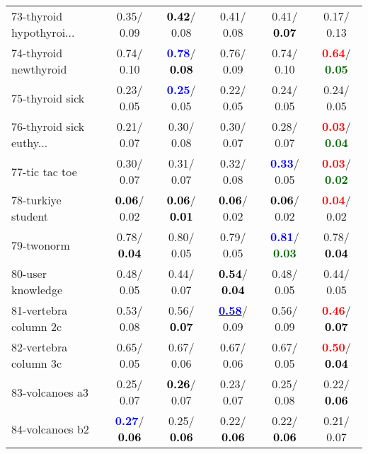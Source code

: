\begin{table}[h]
\begin{center}
\begin{tabular}{lc|c|c|c|c}
73-thyroid hypothyroi... &   0.35/  0.09 & \textcolor{black}{\textbf{  0.42}}/  0.08 &   0.41/  0.08 &   0.41/\textcolor{black}{\textbf{  0.07}} &   0.17/  0.13 \\
74-thyroid newthyroid &   0.74/  0.10 & \textcolor{blue}{\textbf{  0.78}}/\textcolor{black}{\textbf{  0.08}} &   0.76/  0.09 &   0.74/  0.10 & \textcolor{red}{\textbf{  0.64}}/\textcolor{darkgreen}{\textbf{  0.05}} \\
75-thyroid sick &   0.23/  0.05 & \textcolor{blue}{\textbf{  0.25}}/  0.05 &   0.22/  0.05 &   0.24/  0.05 &   0.24/  0.05 \\
76-thyroid sick euthy... &   0.21/  0.07 &   0.30/  0.08 &   0.30/  0.07 &   0.28/  0.07 & \textcolor{red}{\textbf{  0.03}}/\textcolor{darkgreen}{\textbf{  0.04}} \\
77-tic tac toe &   0.30/  0.07 &   0.31/  0.07 &   0.32/  0.08 & \textcolor{blue}{\textbf{  0.33}}/  0.05 & \textcolor{red}{\textbf{  0.03}}/\textcolor{darkgreen}{\textbf{  0.02}} \\
78-turkiye student & \textcolor{black}{\textbf{  0.06}}/  0.02 & \textcolor{black}{\textbf{  0.06}}/\textcolor{black}{\textbf{  0.01}} & \textcolor{black}{\textbf{  0.06}}/  0.02 & \textcolor{black}{\textbf{  0.06}}/  0.02 & \textcolor{red}{\textbf{  0.04}}/  0.02 \\ \hline
79-twonorm &   0.78/\textcolor{black}{\textbf{  0.04}} &   0.80/  0.05 &   0.79/  0.05 & \textcolor{blue}{\textbf{  0.81}}/\textcolor{darkgreen}{\textbf{  0.03}} &   0.78/\textcolor{black}{\textbf{  0.04}} \\
80-user knowledge &   0.48/  0.05 &   0.44/  0.07 & \textcolor{black}{\textbf{  0.54}}/\textcolor{black}{\textbf{  0.04}} &   0.48/  0.05 &   0.44/  0.05 \\
81-vertebra column 2c &   0.53/  0.08 &   0.56/\textcolor{black}{\textbf{  0.07}} & \underline{\textcolor{blue}{\textbf{  0.58}}}/  0.09 &   0.56/  0.09 & \textcolor{red}{\textbf{  0.46}}/\textcolor{black}{\textbf{  0.07}} \\
82-vertebra column 3c &   0.65/  0.05 &   0.67/  0.06 &   0.67/  0.06 &   0.67/  0.05 & \textcolor{red}{\textbf{  0.50}}/\textcolor{black}{\textbf{  0.04}} \\
83-volcanoes a3 &   0.25/  0.07 & \textcolor{black}{\textbf{  0.26}}/  0.07 &   0.23/  0.07 &   0.25/  0.08 &   0.22/\textcolor{black}{\textbf{  0.06}} \\
84-volcanoes b2 & \textcolor{blue}{\textbf{  0.27}}/\textcolor{black}{\textbf{  0.06}} &   0.25/\textcolor{black}{\textbf{  0.06}} &   0.22/\textcolor{black}{\textbf{  0.06}} &   0.22/\textcolor{black}{\textbf{  0.06}} &   0.21/  0.07 \\

\end{tabular}
\end{center}
\end{table}
